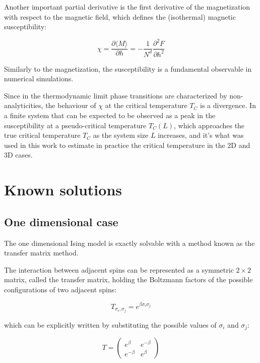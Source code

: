 Another important partial derivative is the first derivative of the magnetization with respect to the magnetic field, which defines the (isothermal) magnetic susceptibility:

\begin{equation}
  \chi = \frac{\partial \langle M \rangle}{\partial h} = -\frac{1}{N^d} \frac{\partial^2 F}{\partial h^2}
  \label{def:susceptibility}
\end{equation}

Similarly to the magnetization, the susceptibility is a fundamental observable in numerical simulations. 

Since in the thermodynamic limit phase transitions are characterized by non-analyticities, the behaviour of $\chi$  at the critical temperature $T_C$ is a divergence. In a finite system that can be expected to be observed as a peak in the susceptibility at a pseudo-critical temperature $T_C(L)$, which approaches the true critical temperature $T_C$ as the system size $L$ increases, and it's what was used in this work to estimate in practice the critical temperature in the 2D and 3D cases.


\section{Known solutions}

\subsection{One dimensional case}

The one dimensional Ising model is exactly solvable with a method known as the transfer matrix method.

The interaction between adjacent spins can be represented as a symmetric $2 \times 2$ matrix, called the transfer matrix, holding the Boltzmann factors of the possible configurations of two adjacent spins:


\begin{equation}
  T_{\sigma_i, \sigma_j} = e^{\beta \sigma_i \sigma_j}
\end{equation}

which can be explicitly written by substituting the possible values of $\sigma_i$ and $\sigma_j$:

\begin{equation}
  T = \begin{pmatrix}
    e^{\beta} & e^{-\beta} \\
    e^{-\beta} & e^{\beta}
  \end{pmatrix}
\end{equation}

